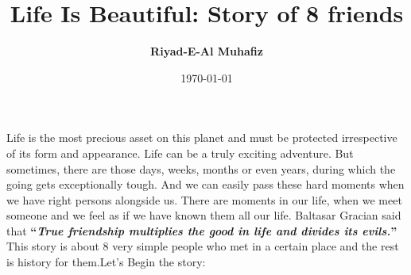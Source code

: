 \documentclass[11pt, a4paper]{article}
\title{\textbf{Life Is Beautiful: Story of 8 friends}}
\author{\textbf{Riyad-E-Al Muhafiz} }
\date{\today}
\begin{document}
\begin{titlepage}
\maketitle
\thispagestyle{empty} 
\end{titlepage}


\noindent Life is the most precious asset on this planet and must be protected irrespective of its form and appearance. Life can be a truly exciting adventure. But sometimes, there are those days, weeks, months or even years, during which the going gets exceptionally tough. And we can easily pass these hard moments when we have right persons alongside us. There are moments in our life, when we meet someone and we feel as if we have known them all our life. Baltasar Gracian said that \textbf{“\textit{True friendship multiplies the good in life and divides its evils.}”} This story is about 8 very simple people who met in a certain place and the rest is history for them.Let's Begin the story:
\end{document}
